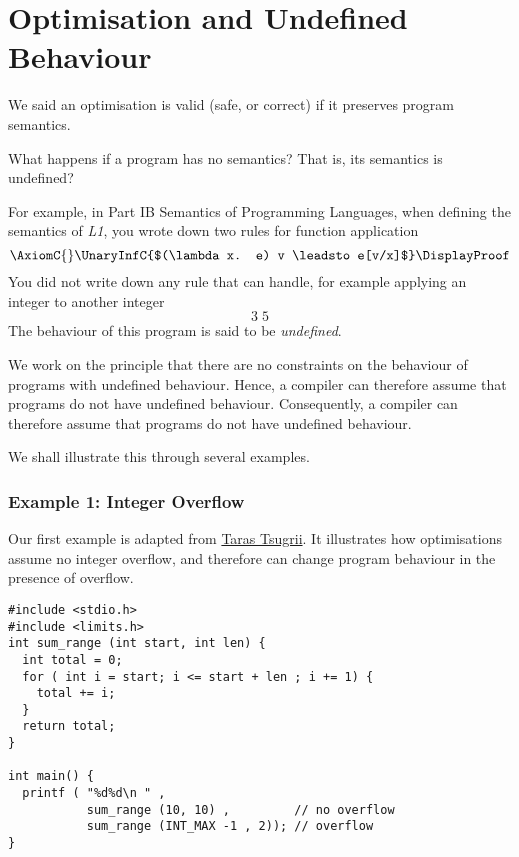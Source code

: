 \section{Optimisation and Undefined Behaviour}
We said an optimisation is valid (safe, or correct) if it preserves program semantics. 

What happens if a program has no semantics? That is, its semantics is undefined?

For example, in \textsf{Part IB Semantics of Programming Languages}, when defining the semantics of \textit{L1}, you wrote down two rules for function application
\[
        \AxiomC{}
        \UnaryInfC{$(\lambda x. e) v \leadsto e[v/x]$}
        \DisplayProof
\]
You did not write down any rule that can handle, for example applying an integer to another integer
\[3 \; 5\]
The behaviour of this program is said to be \textit{undefined}.

We work on the principle that there are no constraints on the behaviour of programs with undefined behaviour. Hence, a compiler can therefore assume that programs do not have undefined behaviour. Consequently, a compiler can therefore assume that programs do not have undefined behaviour.

We shall illustrate this through several examples.

\subsubsection{Example 1: Integer Overflow}
Our first example is adapted from \href{https://softwarebits.substack.com/p/impact-of-undefined-behavior-on-performance}{Taras Tsugrii}. It illustrates how optimisations assume no integer overflow, and therefore can change program behaviour in the presence of overflow. 

\begin{code}
\label{code:optimisation-ub-overflow}
\begin{verbatim}
#include <stdio.h>
#include <limits.h>
int sum_range (int start, int len) {
  int total = 0;
  for ( int i = start; i <= start + len ; i += 1) {
    total += i;
  }
  return total;
}

int main() {
  printf ( "%d%d\n " , 
           sum_range (10, 10) ,         // no overflow
           sum_range (INT_MAX -1 , 2)); // overflow
}
\end{verbatim}
\end{code}

